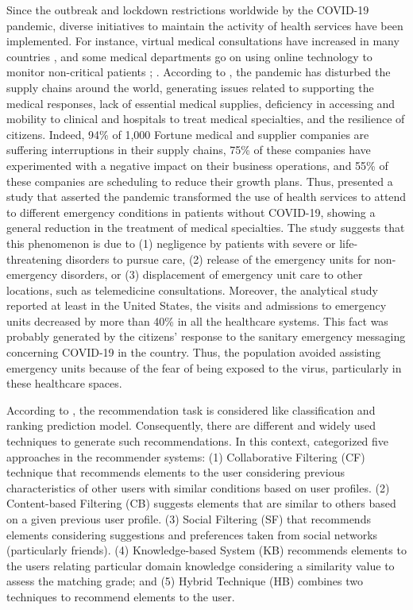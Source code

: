 \documentclass[sustainability,article,submit,pdftex,moreauthors]{Definitions/mdpi}
\begin{document}
Since the outbreak and lockdown restrictions worldwide by the COVID-19 pandemic, diverse initiatives to maintain the activity of health services have been implemented. For instance, virtual medical consultations have increased in many countries \citep{banerjee2020teleconsultation}, and some medical departments go on using online technology to monitor non-critical patients \citep{pinar2021preliminary}; \citep{tamayo2020evaluation}. According to \citet{shahed2021supply}, the pandemic has disturbed the supply chains around the world, generating issues related to supporting the medical responses, lack of essential medical supplies, deficiency in accessing and mobility to clinical and hospitals to treat medical specialties, and the resilience of citizens. Indeed, 94\% of 1,000 Fortune medical and supplier companies are suffering interruptions in their supply chains, 75\% of these companies have experimented with a negative impact on their business operations, and 55\% of these companies are scheduling to reduce their growth plans.
Thus, \citet{rosenbaum2020untold} presented a study that asserted the pandemic transformed the use of health services to attend to different emergency conditions in patients without COVID-19, showing a general reduction in the treatment of medical specialties. The study suggests that this phenomenon is due to (1) negligence by patients with severe or life-threatening disorders to pursue care, (2) release of the emergency units for non-emergency disorders, or (3) displacement of emergency unit care to other locations, such as telemedicine consultations. Moreover, the analytical study reported at least in the United States, the visits and admissions to emergency units decreased by more than 40\% in all the healthcare systems. This fact was probably generated by the citizens' response to the sanitary emergency messaging concerning COVID-19 in the country. Thus, the population avoided assisting emergency units because of the fear of being exposed to the virus, particularly in these healthcare spaces.

{According to \citet{kumar2016approaches}, the recommendation task is considered like classification and ranking prediction model. Consequently, there are different and widely used techniques to generate such recommendations. In this context, \citet{lika2014facing} categorized five approaches in the recommender systems: (1) Collaborative Filtering (CF) technique that recommends elements to the user considering previous characteristics of other users with similar conditions based on user profiles. (2) Content-based Filtering (CB) suggests elements that are similar to others based on a given previous user profile. (3) Social Filtering (SF) that recommends elements considering suggestions and preferences taken from social networks (particularly friends). (4) Knowledge-based System (KB) recommends elements to the users relating particular domain knowledge considering a similarity value to assess the matching grade; and (5) Hybrid Technique (HB) combines two techniques to recommend elements to the user.}  
\end{document}
